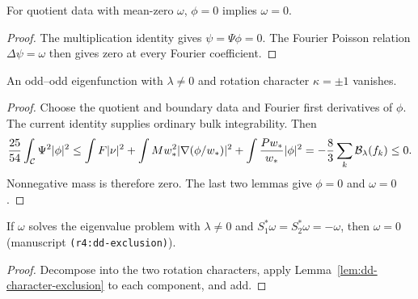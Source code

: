 \begin{lemma}
\label{lem:dd-vorticity-from-quotient}
\leanok
For quotient data with mean-zero $\omega$, $\phi=0$ implies $\omega=0$.
\end{lemma}

\begin{proof}
\leanok
The multiplication identity gives $\psi=\Psi\phi=0$. The Fourier Poisson
relation $\Delta\psi=\omega$ then gives zero at every Fourier coefficient.
\end{proof}

\begin{lemma}
\label{lem:dd-character-exclusion}
\leanok
An odd--odd eigenfunction with $\lambda\ne0$ and rotation character
$\kappa=\pm1$ vanishes.
\end{lemma}

\begin{proof}
\leanok
Choose the quotient and boundary data and Fourier first derivatives of
$\phi$. The current identity supplies ordinary bulk integrability. Then
\[
 \frac{25}{54}\int_{\mathcal{C}}\Psi^2|\phi|^2\le
 \int F|\nu|^2+\int Mw_*^2|\nabla(\phi/w_*)|^2
       +\int\frac{Pw_*}{w_*}|\phi|^2
 =-\frac83\sum_k\mathcal B_\lambda(f_k)\le0.
\]
Nonnegative mass is therefore zero. The last two lemmas give $\phi=0$
and $\omega=0$.
\end{proof}

\begin{theorem}
\label{thm:dd-exclusion}
\leanok
If $\omega$ solves the eigenvalue problem with $\lambda\ne0$ and
$S_1^*\omega=S_2^*\omega=-\omega$, then $\omega=0$ (manuscript
\texttt{(r4:dd-exclusion)}).
\end{theorem}

\begin{proof}
\leanok
Decompose into the two rotation characters, apply
Lemma~\ref{lem:dd-character-exclusion} to each component, and add.
\end{proof}
